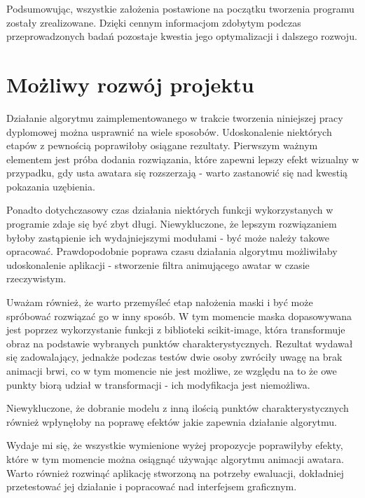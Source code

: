 Podsumowując, wszystkie założenia postawione na początku tworzenia programu zostały zrealizowane. Dzięki cennym informacjom zdobytym podczas przeprowadzonych badań pozostaje kwestia jego optymalizacji i dalszego rozwoju.


\section{Możliwy rozwój projektu}
Działanie algorytmu zaimplementowanego w trakcie tworzenia niniejszej pracy dyplomowej można usprawnić na wiele sposobów. Udoskonalenie niektórych etapów z pewnością poprawiłoby osiągane rezultaty. Pierwszym ważnym elementem jest próba dodania rozwiązania, które zapewni lepszy efekt wizualny w przypadku, gdy usta awatara się rozszerzają - warto zastanowić się nad kwestią pokazania uzębienia.

Ponadto dotychczasowy czas działania niektórych funkcji wykorzystanych w programie zdaje się być zbyt długi. Niewykluczone, że lepszym rozwiązaniem byłoby zastąpienie ich wydajniejszymi modułami - być może należy takowe opracować. Prawdopodobnie poprawa czasu działania algorytmu możliwiłaby udoskonalenie aplikacji - stworzenie filtra animującego awatar w czasie rzeczywistym.

Uważam również, że warto przemyśleć etap nałożenia maski i być może spróbować rozwiązać go w inny sposób. W tym momencie maska dopasowywana jest poprzez wykorzystanie funkcji z biblioteki scikit-image, która transformuje obraz na podstawie wybranych punktów charakterystycznych. Rezultat wydawał się zadowalający, jednakże podczas testów dwie osoby zwróciły uwagę na brak animacji brwi, co w tym momencie nie jest możliwe, ze względu na to że owe punkty biorą udział w transformacji - ich modyfikacja jest niemożliwa.

Niewykluczone, że dobranie modelu z inną ilością punktów charakterystycznych również wpłynęłoby na poprawę efektów jakie zapewnia działanie algorytmu.

Wydaje mi się, że wszystkie wymienione wyżej propozycje poprawiłyby efekty, które w tym momencie można osiągnąć używając algorytmu animacji awatara. Warto również rozwinąć aplikację stworzoną na potrzeby ewaluacji, dokładniej przetestować jej działanie i popracować nad interfejsem graficznym.